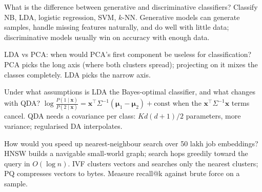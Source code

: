 \begin{qa}{What is the difference between generative and discriminative classifiers? Classify NB, LDA, logistic regression, SVM, $k$-NN.}
\why Generative models can generate samples, handle missing features naturally, and do well with little data; discriminative models usually
win on accuracy with enough data.
\end{qa}

\begin{qa}{LDA vs PCA: when would PCA's first component be useless for classification?}
\why PCA picks the long axis (where both clusters spread); projecting on it mixes the classes completely. LDA picks the narrow axis.
\end{qa}

\begin{qa}{\deep Under what assumptions is LDA the Bayes-optimal classifier, and what changes with QDA?}
\why $\log\frac{P(1\mid\mathbf x)}{P(2\mid\mathbf x)} = \mathbf x^\top\Sigma^{-1}(\boldsymbol\mu_1 - \boldsymbol\mu_2) + \text{const}$ when the
$\mathbf x^\top\Sigma^{-1}\mathbf x$ terms cancel. QDA needs a covariance per class: $Kd(d+1)/2$ parameters, more variance; regularised DA
interpolates.
\end{qa}

\begin{qa}{How would you speed up nearest-neighbour search over 50 lakh job embeddings?}
\why HNSW builds a navigable small-world graph; search hops greedily toward the query in $O(\log n)$. IVF clusters vectors and searches only
the nearest clusters; PQ compresses vectors to bytes. Measure recall@k against brute force on a sample.
\end{qa}

